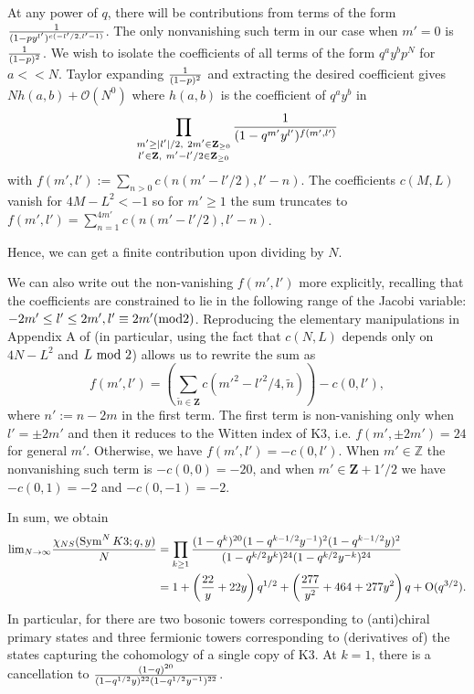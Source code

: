 \documentclass[11pt]{amsart}
\newcommand{\Z}{\mathbf Z}
\DeclareMathOperator{\Sym}{Sym} \DeclareMathOperator{\Hom}{Hom}
\theoremstyle{thm}
\numberwithin{equation}{subsection}
\theoremstyle{def}
\theoremstyle{rem}
\begin{document}
At any power of $q$, there will be contributions from terms of the form ${1 \over (1 - p y^{l'})^{c(-l'/2, l'-1)}}$. The only nonvanishing such term in our case when $m'=0$ is ${1 \over (1 - p)^2}$. We wish to isolate the coefficients of all terms of the form $q^a y^b p^N$ for $a << N$. Taylor expanding ${1 \over (1-p)^2}$ and extracting the desired coefficient gives $N h(a, b) + \mathcal{O}(N^0)$ where $h(a, b)$ is the coefficient of $q^a y^b$ in
\begin{equation}\nonumber
\prod_{\substack{m' \geq |l'|/2, \ 2 m' \in \Z_{\geq 0} \\ l' \in \Z, \  m' - l'/2 \in \Z_{\geq 0}}}{1 \over (1 - q^{m'} y^{l'})^{f(m', l')}}
\end{equation}with $f(m', l'):= \sum_{n >0}c(n(m' -  l'/2), l' - n)$.  The coefficients $c(M, L)$ vanish for $4M-L^2 < -1$ so for $m' \geq 1$ the sum truncates to $f(m', l') = \sum_{n=1}^{4m'}c(n(m' -  l'/2), l' - n)$.

Hence, we can get a finite contribution upon dividing by $N$. 

We can also write out the non-vanishing $f(m', l')$ more explicitly, recalling that the coefficients are constrained to lie in the following range of the Jacobi variable: $-2m' \leq l' \leq 2m', l' \equiv 2 m' {\rm (mod 2)}$. Reproducing the elementary manipulations in Appendix A of \cite{BKKP} (in particular, using the fact that $c(N, L)$ depends only on $4N-L^2$ and $L \ {\rm mod} \ 2$) allows us to rewrite the sum as
\begin{equation}\label{eq:fml2}
f(m', l') = \left( \sum_{\tilde{n} \in \Z}c(m'^2 - l'^2/4, \tilde{n}) \right) - c(0, l'),
\end{equation} where $n':= n - 2m$ in the first term. 
The first term is non-vanishing only when $l' = \pm 2 m'$ and then it reduces to the Witten index of K3, i.e. $f(m', \pm 2m') = 24$ for general $m'$. Otherwise, we have $f(m', l') = -c(0, l')$. When $m' \in \mathbb{Z}$ the nonvanishing such term is $-c(0, 0) = -20$, and when $m' \in \Z + 1'/2$ we have $-c(0, 1) = -2$ and $-c(0, -1) = -2$. 

In sum, we obtain
\begin{align*}
{\rm lim}_{N \rightarrow \infty}{\chi_{NS}(\Sym^{N} K3; q, y) \over N} &= \prod_{k \geq 1}{(1 - q^k)^{20}(1 - q^{k-1/2}y^{-1})^2(1 - q^{k-1/2}y)^2 \over (1 - q^{k/2}y^k)^{24}(1 - q^{k/2}y^{-k})^{24}} \\
&= 1 + \left({22 \over y} + 22 y \right)q^{1/2} + \left({277 \over y^2} + 464 + 277 y^2 \right)q + \text{O}(q^{3/2}).
\end{align*} 
In particular, for there are two bosonic towers corresponding to (anti)chiral primary states and three fermionic towers corresponding to (derivatives of) the states capturing the cohomology of a single copy of K3. At $k=1$, there is a cancellation to ${(1 - q)^{20} \over (1 - q^{1/2}y)^{22}(1 - q^{1/2}y^{-1})^{22}}$.
\end{document}
